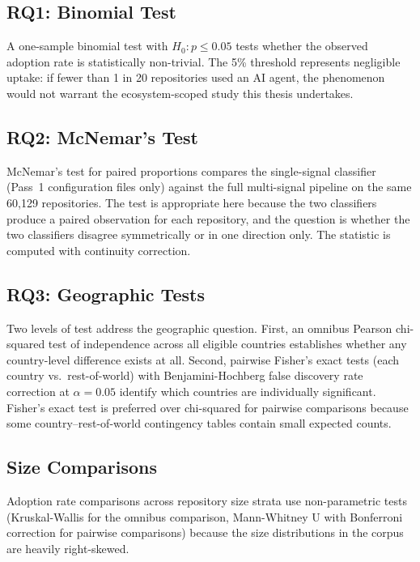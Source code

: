 \subsection{RQ1: Binomial Test}

A one-sample binomial test with $H_0: p \leq 0.05$ tests whether the observed adoption rate is statistically non-trivial. The 5\% threshold represents negligible uptake: if fewer than 1 in 20 repositories used an AI agent, the phenomenon would not warrant the ecosystem-scoped study this thesis undertakes.

\subsection{RQ2: McNemar's Test}

McNemar's test for paired proportions compares the single-signal classifier (Pass~1 configuration files only) against the full multi-signal pipeline on the same 60,129 repositories. The test is appropriate here because the two classifiers produce a paired observation for each repository, and the question is whether the two classifiers disagree symmetrically or in one direction only. The statistic is computed with continuity correction.

\subsection{RQ3: Geographic Tests}

Two levels of test address the geographic question. First, an omnibus Pearson chi-squared test of independence across all eligible countries establishes whether any country-level difference exists at all. Second, pairwise Fisher's exact tests (each country vs.\ rest-of-world) with Benjamini-Hochberg false discovery rate correction at $\alpha = 0.05$ identify which countries are individually significant. Fisher's exact test is preferred over chi-squared for pairwise comparisons because some country--rest-of-world contingency tables contain small expected counts.

\subsection{Size Comparisons}

Adoption rate comparisons across repository size strata use non-parametric tests (Kruskal-Wallis for the omnibus comparison, Mann-Whitney U with Bonferroni correction for pairwise comparisons) because the size distributions in the corpus are heavily right-skewed.
